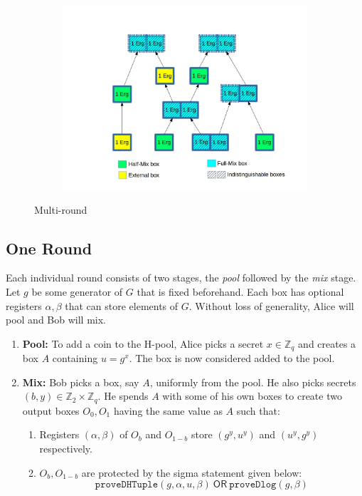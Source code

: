 \documentclass[runningheads]{llncs}
\newcommand{\ornode}{\ensuremath{\mathsf{OR}}}
\begin{document}
\begin{figure}[h]
	\centering
	\begin{subfigure}{.7\textwidth}
		\centering
		\includegraphics[width=\linewidth]{ZeroJoin}
	\end{subfigure}
	\caption{Multi-round \algname}
\label{fig:mixname}
\end{figure}

\subsection{One \algname Round}
Each individual \algname round consists of two stages, the {\em pool} followed by the {\em mix} stage. 
Let $g$ be some generator of $G$ that is fixed beforehand. Each box has optional registers ${\alpha}, {\beta}$ that can store elements of $G$.
Without loss of generality, Alice will pool and Bob will mix. 

\begin{enumerate}
	\item \textbf{Pool:} To add a coin to the H-pool, Alice picks a secret $x\in \mathbb{Z}_q$ and creates a box $A$ containing $u = g^x$. The box is now considered added to the pool. 
	\item \textbf{Mix:} Bob picks a box, say $A$, uniformly from the pool. He also picks secrets $(b, y) \in \mathbb{Z}_2\times \mathbb{Z}_q$. He spends $A$ with some of his own boxes to create two output boxes $O_0, O_1$ having the same value as $A$ such that:
	\begin{enumerate}
		\item Registers $({\alpha}, {\beta})$ of $O_b$ and $O_{1-b}$ store $(g^y, u^y)$ and $(u^y, g^y)$ respectively. 
		\item $O_b, O_{1-b}$ are protected by the sigma statement given below:
    		\begin{equation}\label{fullScriptEqn}
    		    \texttt{proveDHTuple}(g, {\alpha}, u, {\beta})~\ornode~\texttt{proveDlog}(g, {\beta})
    		\end{equation}
	\end{enumerate}
\end{enumerate}
\end{document}
